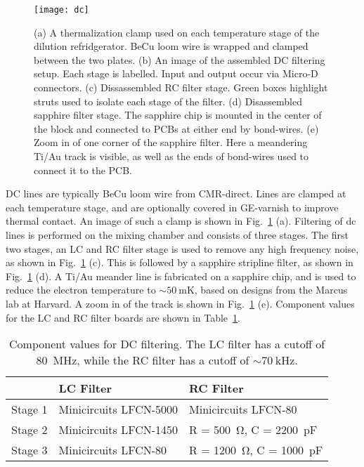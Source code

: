 \begin{figure}
    \texttt{[image: dc]}
    \caption[DC thermalization]
    {\label{fig:dc}(a) A thermalization clamp used on each temperature stage of the dilution refridgerator. BeCu loom
    wire is wrapped and clamped between the two plates. (b) An image of the assembled DC filtering setup. Each stage
    is labelled. Input and output occur via Micro-D connectors. (c) Dissassembled RC filter stage. Green boxes
    highlight struts used to isolate each stage of the filter. (d) Disassembled sapphire filter stage. The sapphire
    chip is mounted in the center of the block and connected to PCBs at either end by bond-wires. (e) Zoom in of
    one corner of the sapphire filter. Here a meandering Ti/Au track is visible, as well as the ends of bond-wires
    used to connect it to the PCB.}
\end{figure}

DC lines are typically BeCu loom wire from CMR-direct. Lines are clamped at each temperature stage, and are optionally
covered in GE-varnish to improve thermal contact. An image of such a clamp is shown in Fig.~\ref{fig:dc} (a). Filtering
of dc lines is performed on the mixing chamber and consists of three stages. The first two stages, an LC and RC filter
stage is used to remove any high frequency noise, as shown in Fig.~\ref{fig:dc} (c). This is followed by a sapphire
stripline filter, as shown in Fig.~\ref{fig:dc} (d). A Ti/Au meander line is fabricated on a sapphire chip, and is used
to reduce the electron temperature to $\sim \SI{50}{\milli\kelvin}$, based on designs from the Marcus lab at Harvard.
A zoom in of the track is shown in Fig.~\ref{fig:dc} (e). Component values for the LC and RC filter boards are shown in
Table~\ref{tab:filt}.

\begin{table}
    \centering
    \begin{tabular}{|l|l|l|}
    \hline
     & LC Filter & RC Filter \\
    \hline
    Stage 1 & Minicircuits LFCN-5000 & Minicircuits LFCN-80\\
    Stage 2 & Minicircuits LFCN-1450 & R = \SI{500}{\ohm}, C = \SI{2200}{\pico\farad} \\
    Stage 3 & Minicircuits LFCN-80 & R = \SI{1200}{\ohm}, C = \SI{1000}{\pico\farad} \\
    \hline
    \end{tabular}
    \caption[Component values for DC filers]{Component values for DC filtering. The LC filter has a cutoff of \SI{80}{\mega\hertz}, while the RC filter
    has a cutoff of $\sim \SI{70}{\kilo\hertz}$.}
    \label{tab:filt}
  \end{table}
